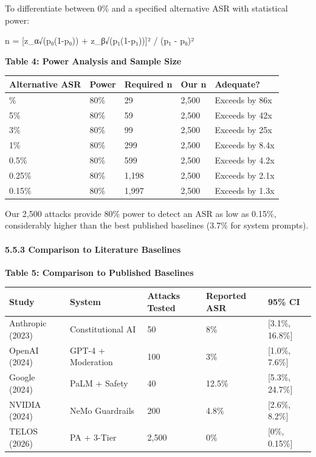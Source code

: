 To differentiate between 0\% and a specified alternative ASR with
statistical power:

n = {[}z\_α√(p₀(1-p₀)) + z\_β√(p₁(1-p₁)){]}² / (p₁ - p₀)²

\textbf{Table 4: Power Analysis and Sample Size}

{\def\LTcaptype{none} %
\begin{longtable}[]{@{}lllll@{}}
\toprule\noalign{}
Alternative ASR & Power & Required n & Our n & Adequate? \\
\midrule\noalign{}
\endhead
\bottomrule\noalign{}
\endlastfoot
10\% & 80\% & 29 & 2,500 & Exceeds by 86x \\
5\% & 80\% & 59 & 2,500 & Exceeds by 42x \\
3\% & 80\% & 99 & 2,500 & Exceeds by 25x \\
1\% & 80\% & 299 & 2,500 & Exceeds by 8.4x \\
0.5\% & 80\% & 599 & 2,500 & Exceeds by 4.2x \\
0.25\% & 80\% & 1,198 & 2,500 & Exceeds by 2.1x \\
0.15\% & 80\% & 1,997 & 2,500 & Exceeds by 1.3x \\
\end{longtable}
}

Our 2,500 attacks provide 80\% power to detect an ASR as low as 0.15\%,
considerably higher than the best published baselines (3.7\% for system
prompts).

\paragraph{5.5.3 Comparison to Literature
Baselines}\label{comparison-to-literature-baselines}

\textbf{Table 5: Comparison to Published Baselines}

{\def\LTcaptype{none} %
\begin{longtable}[]{@{}lllll@{}}
\toprule\noalign{}
Study & System & Attacks Tested & Reported ASR & 95\% CI \\
\midrule\noalign{}
\endhead
\bottomrule\noalign{}
\endlastfoot
Anthropic (2023) & Constitutional AI & 50 & 8\% & {[}3.1\%, 16.8\%{]} \\
OpenAI (2024) & GPT-4 + Moderation & 100 & 3\% & {[}1.0\%, 7.6\%{]} \\
Google (2024) & PaLM + Safety & 40 & 12.5\% & {[}5.3\%, 24.7\%{]} \\
NVIDIA (2024) & NeMo Guardrails & 200 & 4.8\% & {[}2.6\%, 8.2\%{]} \\
TELOS (2026) & PA + 3-Tier & 2,500 & 0\% & {[}0\%, 0.15\%{]} \\
\end{longtable}
}


